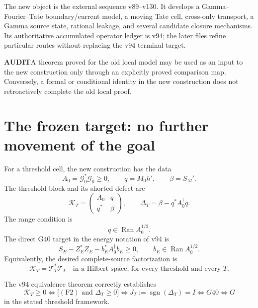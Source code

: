 \documentclass[11pt]{article}
\newcommand{\AUDIT}{\textcolor{orange!80!black}{\textbf{AUDIT}}}
\newcommand{\Ran}{\operatorname{Ran}}
\newcommand{\sgn}{\operatorname{sgn}}
\begin{document}
The new object is the external sequence v89--v130.  It develops a
Gamma--Fourier--Tate boundary/current model, a moving Tate cell, cross-only
transport, a Gamma source state, rational leakage, and several candidate closure
mechanisms.  Its authoritative accumulated operator ledger is v94; the later
files refine particular routes without replacing the v94 terminal target.

\medskip
\noindent\AUDIT\quad A theorem proved for the old local model may be used as an
input to the new construction only through an explicitly proved comparison map.
Conversely, a formal or conditional identity in the new construction does not
retroactively complete the old local proof.

\section{The frozen target: no further movement of the goal}

For a threshold cell, the new construction has the data
\[
 A_0=\mathcal G_0^*\mathcal G_0\geq0,
 \qquad q=M_0h',
 \qquad \beta=S_M'.
\]
The threshold block and its shorted defect are
\begin{equation}
 \mathcal K_T=
 \begin{pmatrix}A_0&q\\q^*&\beta\end{pmatrix},
 \qquad
 \Delta_T=\beta-q^*A_0^\dagger q .
 \tag{F1}
\end{equation}
The range condition is
\begin{equation}
 q\in\Ran A_0^{1/2}.
 \tag{F2}
\end{equation}
The direct G40 target in the energy notation of v94 is
\begin{equation}
 S_E-Z_E^*Z_E-b_E^*A_0^\dagger b_E\geq0,
 \qquad b_E\in\Ran A_0^{1/2}.
 \tag{F3}
\end{equation}
Equivalently, the desired complete-source factorization is
\begin{equation}
 \mathcal K_T=\mathcal T_T^*\mathcal T_T
 \quad\text{in a Hilbert space, for every threshold and every }T.
 \tag{F4}
\end{equation}

The v94 equivalence theorem correctly establishes
\begin{equation}
 \mathcal K_T\geq0
 \Longleftrightarrow
 \bigl[(\mathrm{F2})\text{ and }\Delta_T\geq0\bigr]
 \Longleftrightarrow
 J_T:=\sgn(\Delta_T)=I
 \Longleftrightarrow G40
 \Longleftrightarrow G
 \tag{F5}
\end{equation}
in the stated threshold framework.
\end{document}
